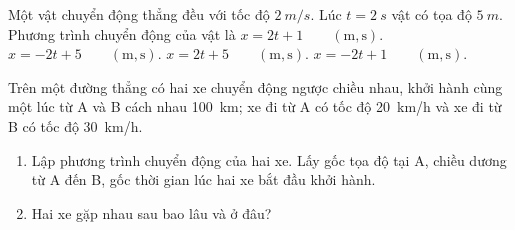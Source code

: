 \begin{vd}
	Một vật chuyển động thẳng đều với tốc độ $\SI{2}{m/s}$. Lúc $t = \SI{2}{s}$ vật có tọa độ $\SI{5}{m}$. Phương trình chuyển động của vật là 
	\choice
	{\True $x=2t+1\qquad\left(\si{\meter}, \si{\second}\right)$.}
	{$x=-2t +5\qquad\left(\si{\meter}, \si{\second}\right)$.}
	{$x=2t+5\qquad\left(\si{\meter}, \si{\second}\right)$.}
	{$x=-2t+1\qquad\left(\si{\meter}, \si{\second}\right)$.}
\end{vd}

\begin{vd}
	Trên một đường thẳng có hai xe chuyển động ngược chiều nhau, khởi hành cùng một lúc từ A và B cách nhau \SI{100}{\kilo\meter}; xe đi từ A có tốc độ \SI{20}{\kilo\meter/\hour} và xe đi từ B có tốc độ \SI{30}{\kilo\meter/\hour}.
	\begin{enumerate}[label=\alph*)]
		\item Lập phương trình chuyển động của hai xe. Lấy gốc tọa độ tại A, chiều dương từ A đến B, gốc thời gian lúc hai xe bắt đầu khởi hành.
		\item Hai xe gặp nhau sau bao lâu và ở đâu?
	\end{enumerate}
\end{vd}

